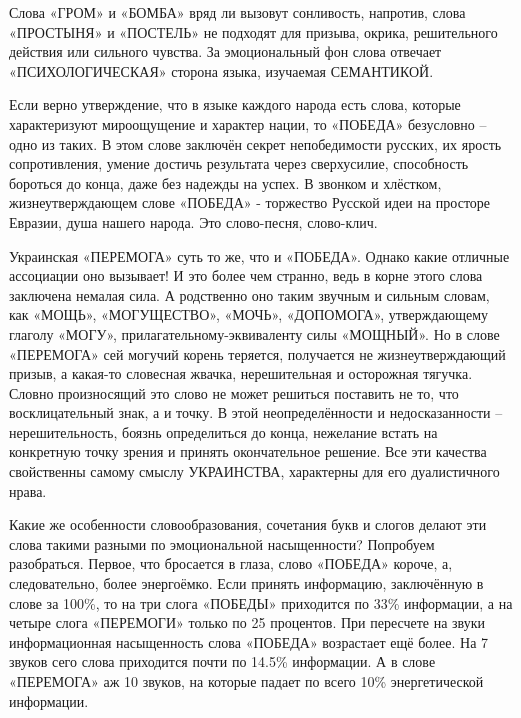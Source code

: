 Слова «ГРОМ» и «БОМБА» вряд ли вызовут сонливость, напротив, слова «ПРОСТЫНЯ» и
«ПОСТЕЛЬ» не подходят для призыва, окрика, решительного действия или сильного
чувства. За эмоциональный фон слова отвечает «ПСИХОЛОГИЧЕСКАЯ» сторона языка,
изучаемая СЕМАНТИКОЙ.

Если верно утверждение, что в языке каждого народа есть слова, которые
характеризуют мироощущение и характер нации, то «ПОБЕДА» безусловно – одно из
таких. В этом слове заключён секрет непобедимости русских, их ярость
сопротивления, умение достичь результата через сверхусилие, способность
бороться до конца, даже без надежды на успех. В звонком и хлёстком,
жизнеутверждающем слове «ПОБЕДА» - торжество Русской идеи на просторе Евразии,
душа нашего народа. Это слово-песня, слово-клич.

Украинская «ПЕРЕМОГА» суть то же, что и «ПОБЕДА». Однако какие отличные
ассоциации оно вызывает! И это более чем странно, ведь в корне этого слова
заключена немалая сила. А родственно оно таким звучным и сильным словам, как
«МОЩЬ», «МОГУЩЕСТВО», «МОЧЬ», «ДОПОМОГА», утверждающему глаголу «МОГУ»,
прилагательному-эквиваленту силы «МОЩНЫЙ». Но в слове «ПЕРЕМОГА» сей могучий
корень теряется, получается не жизнеутверждающий призыв, а какая-то словесная
жвачка, нерешительная и осторожная тягучка. Словно произносящий это слово не
может решиться поставить не то, что восклицательный знак, а и точку.  В этой
неопределённости и недосказанности – нерешительность, боязнь определиться до
конца, нежелание встать на конкретную точку зрения и принять окончательное
решение. Все эти качества свойственны самому смыслу УКРАИНСТВА, характерны для
его дуалистичного нрава.


Какие же особенности словообразования, сочетания букв и слогов делают эти слова
такими разными по эмоциональной насыщенности? Попробуем разобраться. Первое,
что бросается в глаза, слово «ПОБЕДА» короче, а, следовательно, более
энергоёмко. Если принять информацию, заключённую в слове за 100\%, то на три
слога «ПОБЕДЫ» приходится по 33\% информации, а на четыре слога «ПЕРЕМОГИ»
только по 25 процентов. При пересчете на звуки информационная насыщенность
слова «ПОБЕДА» возрастает ещё более. На 7 звуков сего слова приходится почти по
14.5\% информации. А в слове «ПЕРЕМОГА» аж 10 звуков, на которые падает по всего
10\% энергетической информации.

